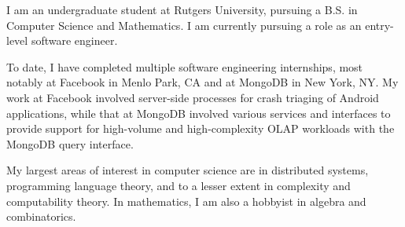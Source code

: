 

\begin{cvparagraph}
I am an undergraduate student at Rutgers University, pursuing a B.S. in Computer Science and Mathematics. I am currently pursuing a role as an entry-level software engineer.
\end{cvparagraph}

\begin{cvparagraph}
To date, I have completed multiple software engineering internships, most notably at Facebook in Menlo Park, CA and at MongoDB in New York, NY. My work at Facebook involved server-side processes for crash triaging of Android applications, while that at MongoDB involved various services and interfaces to provide support for high-volume and high-complexity OLAP workloads with the MongoDB query interface.
\end{cvparagraph}

\begin{cvparagraph}
My largest areas of interest in computer science are in distributed systems, programming language theory, and to a lesser extent in complexity and computability theory. In mathematics, I am also a hobbyist in algebra and combinatorics.
\end{cvparagraph}
